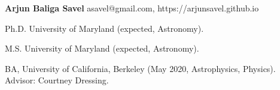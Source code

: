 \documentclass[12pt,letterpaper]{article}
\begin{document}
\thispagestyle{empty}\sloppy\sloppypar\raggedbottom

\textbf{\Large Arjun Baliga Savel} \hfill
\textsf{\small asavel@gmail.com, https://arjunsavel.github.io} \\

\begin{list}{}{\cvlist}
\item
Ph.D. University of Maryland (expected, Astronomy).
\item
M.S. University of Maryland (expected, Astronomy).
\item
BA, University of California, Berkeley (May 2020, Astrophysics, Physics). Advisor: Courtney Dressing.
\end{list}


\ifdefined\withpubs
    

    \begin{list}{}{\cvlist}
    
    \end{list}

    \begin{list}{}{\cvlist}
    
    \end{list}
\fi
\end{document}
